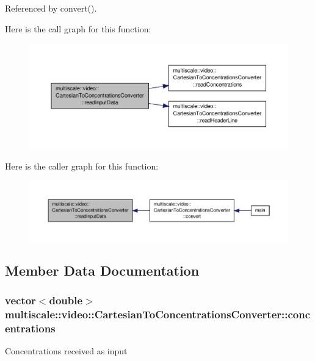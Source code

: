 Referenced by convert().



Here is the call graph for this function\-:
\nopagebreak
\begin{figure}[H]
\begin{center}
\leavevmode
\includegraphics[width=350pt]{classmultiscale_1_1video_1_1CartesianToConcentrationsConverter_a94094cdeaf0f48164911188709dc0e2f_cgraph}
\end{center}
\end{figure}




Here is the caller graph for this function\-:
\nopagebreak
\begin{figure}[H]
\begin{center}
\leavevmode
\includegraphics[width=350pt]{classmultiscale_1_1video_1_1CartesianToConcentrationsConverter_a94094cdeaf0f48164911188709dc0e2f_icgraph}
\end{center}
\end{figure}




\subsection{Member Data Documentation}
\hypertarget{classmultiscale_1_1video_1_1CartesianToConcentrationsConverter_a335f54163cbabeaa80c1da811b9f9c0c}{
\subsubsection[{concentrations}]{\setlength{\rightskip}{0pt plus 5cm}vector$<$double$>$ multiscale\-::video\-::\-Cartesian\-To\-Concentrations\-Converter\-::concentrations\hspace{0.3cm}{\ttfamily [private]}}}\label{classmultiscale_1_1video_1_1CartesianToConcentrationsConverter_a335f54163cbabeaa80c1da811b9f9c0c}
Concentrations received as input 

